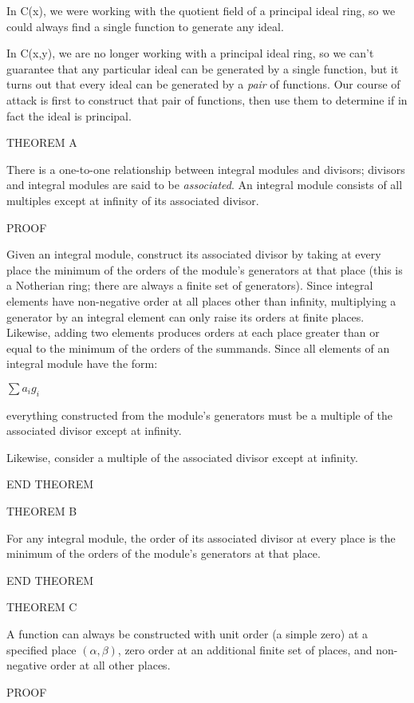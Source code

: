 
In C(x), we were working with the quotient field of a principal ideal
ring, so we could always find a single function to generate any ideal.

In C(x,y), we are no longer working with a principal ideal ring, so we
can't guarantee that any particular ideal can be generated by a single
function, but it turns out that every ideal can be generated by a {\it
pair} of functions.  Our course of attack is first to construct that
pair of functions, then use them to determine if in fact the ideal
is principal.

THEOREM A

There is a one-to-one relationship between integral modules and
divisors; divisors and integral modules are said to be {\it
associated}.  An integral module consists of all multiples except at
infinity of its associated divisor.

PROOF

Given an integral module, construct its associated divisor by taking
at every place the minimum of the orders of the module's generators at
that place (this is a Notherian ring; there are always a finite set of
generators).  Since integral elements have non-negative order at all
places other than infinity, multiplying a generator by an integral
element can only raise its orders at finite places.  Likewise, adding
two elements produces orders at each place greater than or equal to
the minimum of the orders of the summands.  Since all elements of an
integral module have the form:

	$\sum a_i g_i$

everything constructed from the module's generators must be a
multiple of the associated divisor except at infinity.

Likewise, consider a multiple of the associated divisor except at
infinity.

END THEOREM

THEOREM B

For any integral module, the order of its associated divisor at every
place is the minimum of the orders of the module's generators at that
place.

END THEOREM

THEOREM C

A function can always be constructed with unit order (a simple zero)
at a specified place $(\alpha, \beta)$, zero order at an additional
finite set of places, and non-negative order at all other places.

PROOF

